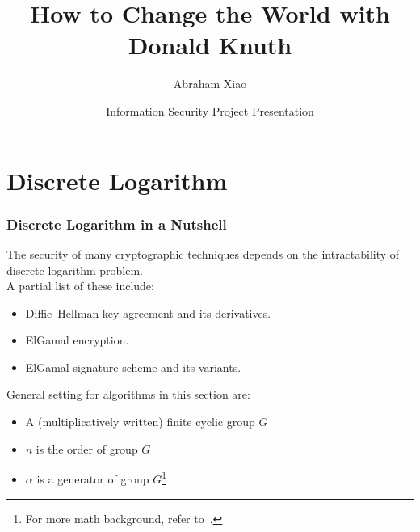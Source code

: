 \documentclass[hyperref=true]{beamer}
\begin{document}
\title[Change the World]{How to Change the World with Donald Knuth}
\author{Abraham Xiao}
\date[CIS612 Presentation]{Information Security Project Presentation}



\begin{frame}
  \titlepage{}
\end{frame}

\begin{frame}
  \tableofcontents{}
\end{frame}

%   
    

\section{Discrete Logarithm}
\label{sec:discrete-logarithm}



\begin{frame}
  \frametitle{Discrete Logarithm in a Nutshell}
The security of many cryptographic techniques depends on the
intractability of discrete logarithm problem.\\[4pt]A partial list of these
include:
\begin{itemize}
\item Diffie–Hellman key agreement and its derivatives.
\item ElGamal encryption.
\item ElGamal signature scheme and its variants.
\end{itemize}
General setting for algorithms in this section are:
\begin{itemize}
\item A (multiplicatively written) finite cyclic group $G$
\item $n$ is the order of group $G$
\item $\alpha$ is a generator of group $G$\footnote{For more math
    background, refer to~\cite{Rosen:2012}.}
\end{itemize}
\end{frame}
\end{document}
